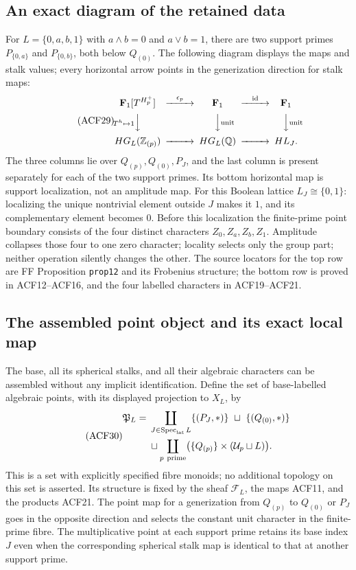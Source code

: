 \subsection{An exact diagram of the retained data}
For $L=\{0,a,b,1\}$ with $a\wedge b=0$ and $a\vee b=1$, there are two
support primes $P_{\{0,a\}}$ and $P_{\{0,b\}}$, both below $Q_{(0)}$.
The following diagram displays the maps and stalk values; every
horizontal arrow points in the generization direction for stalk maps:
\begin{equation}\tag{ACF29}
\begin{CD}
 \mathbf F_1[T^{H_p^+}] @>{\epsilon_p}>> \mathbf F_1
                              @>{\operatorname{id}}>> \mathbf F_1\\
 @V{T^h\mapsto1}VV @VV{\rm unit}V @VV{\rm unit}V\\
 H G_L(\mathbb Z_{(p)}) @>>> H G_L(\mathbb Q) @>>> H L_J .
\end{CD}
\end{equation}
The three columns lie over $Q_{(p)},Q_{(0)},P_J$, and the last column
is present separately for each of the two support primes. Its bottom
horizontal map is support localization, not an amplitude map.
For this Boolean lattice $L_J\cong\{0,1\}$: localizing the unique
nontrivial element outside $J$ makes it $1$, and its complementary
element becomes $0$. Before this localization the finite-prime point
boundary consists of the four distinct characters
$Z_0,Z_a,Z_b,Z_1$. Amplitude collapses those four to one zero character;
locality selects only the group part; neither operation silently changes
the other. The source locators for the top row are FF Proposition
\texttt{prop12} and its Frobenius structure; the bottom row is proved
in ACF12--ACF16, and the four labelled characters in ACF19--ACF21.


\subsection{The assembled point object and its exact local map}
The base, all its spherical stalks, and all their algebraic characters
can be assembled without any implicit identification. Define the set
of base-labelled algebraic points, with its displayed projection to
$X_L$, by
\begin{equation}\tag{ACF30}
 \begin{split}
 \mathfrak P_L={}&
 \coprod_{J\in\operatorname{Spec}_{\rm lat}L}\{(P_J,*)\}
 \ \sqcup\ \{(Q_{(0)},*)\}\\
 &\sqcup\coprod_{p\ \mathrm{prime}}
       \bigl(\{Q_{(p)}\}\times(\mathcal U_p\sqcup L)\bigr).
 \end{split}
\end{equation}
This is a set with explicitly specified fibre monoids; no additional
topology on this set is asserted. Its structure is fixed by the sheaf
$\mathcal F_L$, the maps ACF11, and the products ACF21. The point map
for a generization from $Q_{(p)}$ to $Q_{(0)}$ or $P_J$ goes in the
opposite direction and selects the constant unit character in the
finite-prime fibre. The multiplicative point at each support prime
retains its base index $J$ even when the corresponding spherical
stalk map is identical to that at another support prime.

